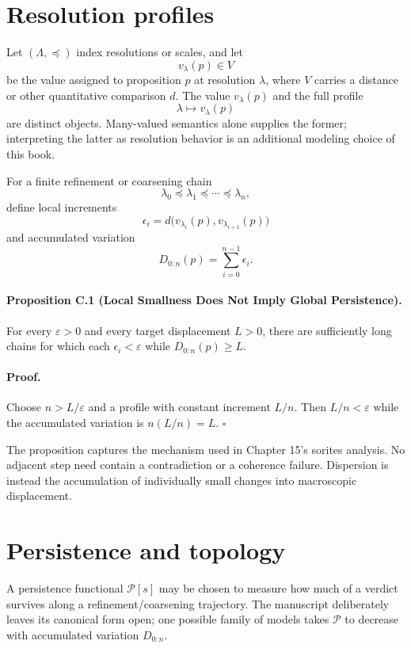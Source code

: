 \section*{Resolution profiles}
Let $(\Lambda,\preceq)$ index resolutions or scales, and let
\[
v_\lambda(p)\in V
\]
be the value assigned to proposition $p$ at resolution $\lambda$, where $V$ carries a distance or other quantitative comparison $d$. The value $v_\lambda(p)$ and the full profile
\[
\lambda\longmapsto v_\lambda(p)
\]
are distinct objects. Many-valued semantics alone supplies the former; interpreting the latter as resolution behavior is an additional modeling choice of this book.

For a finite refinement or coarsening chain
\[
\lambda_0\preceq\lambda_1\preceq\cdots\preceq\lambda_n,
\]
define local increments
\[
\epsilon_i=d\bigl(v_{\lambda_i}(p),v_{\lambda_{i+1}}(p)\bigr)
\]
and accumulated variation
\[
D_{0:n}(p)=\sum_{i=0}^{n-1}\epsilon_i.
\]

\paragraph{Proposition C.1 (Local Smallness Does Not Imply Global Persistence).}
For every $\varepsilon>0$ and every target displacement $L>0$, there are sufficiently long chains for which each $\epsilon_i<\varepsilon$ while $D_{0:n}(p)\ge L$.

\paragraph{Proof.}
Choose $n>L/\varepsilon$ and a profile with constant increment $L/n$. Then $L/n<\varepsilon$ while the accumulated variation is $n(L/n)=L$. \hfill$\square$

The proposition captures the mechanism used in Chapter 15's sorites analysis. No adjacent step need contain a contradiction or a coherence failure. Dispersion is instead the accumulation of individually small changes into macroscopic displacement.

\section*{Persistence and topology}
A persistence functional $\mathcal P[s]$ may be chosen to measure how much of a verdict survives along a refinement/coarsening trajectory. The manuscript deliberately leaves its canonical form open; one possible family of models takes $\mathcal P$ to decrease with accumulated variation $D_{0:n}$.

